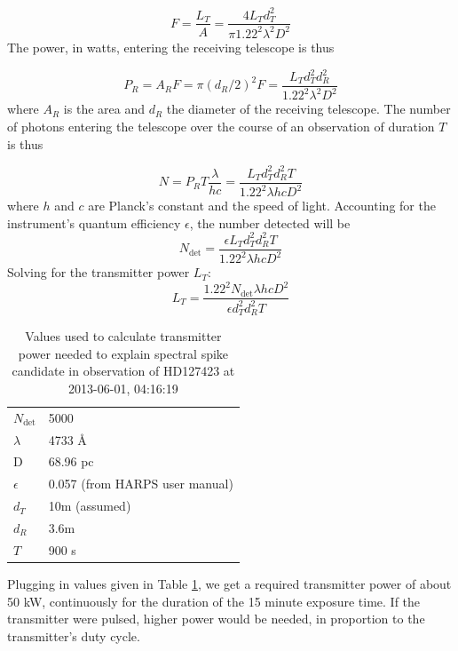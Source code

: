 \documentclass[linenumbers]{aastex631}
\begin{document}
\begin{equation}
    F = \frac{L_T}{A} = \frac{4 L_T d_T^2}{\pi 1.22^2 \lambda^2 D^2}
\end{equation}
The power, in watts, entering the receiving telescope is thus

\begin{equation}
    P_R = A_R F = \pi (d_R/2)^2 F = \frac{L_T d_T^2 d_R^2}{1.22^2 \lambda^2 D^2}
\end{equation}
where $A_R$ is the area and $d_R$ the diameter of the receiving telescope.  The number of photons entering the telescope over the course of an observation of duration $T$ is thus

\begin{equation}
    N = P_R T \frac{\lambda}{h c} = \frac{L_T d_T^2 d_R^2 T}{1.22^2 \lambda h c D^2}
\end{equation}
where $h$ and $c$ are Planck's constant and the speed of light.  Accounting for the instrument's quantum efficiency $\epsilon$, the number detected will be
\begin{equation}
    N_{\mbox{det}} = \frac{\epsilon L_T d_T^2 d_R^2 T}{1.22^2 \lambda h c D^2}
\end{equation}
Solving for the transmitter power $L_T$:
\begin{equation}
    L_T = \frac{1.22^2 N_{\mbox{det}} \lambda h c D^2}{\epsilon d_T^2 d_R^2 T}
\end{equation}

\begin{table}[h]
\begin{tabular}{ll}
$N_{\mbox{det}}$ & 5000\\
$\lambda$ & 4733 \AA \\
D & 68.96 pc \\
$\epsilon$ & 0.057 (from HARPS user manual)\\
$d_T$ & 10m (assumed) \\
$d_R$ & 3.6m \\
$T$ & 900 s\\
\end{tabular}
\label{t:powervalues}
\caption{Values used to calculate transmitter power needed to explain spectral spike candidate in observation of HD127423 at 2013-06-01, 04:16:19}
\end{table}

Plugging in values given in Table \ref{t:powervalues}, we get a required transmitter power of about 50 kW, continuously for the duration of the 15 minute exposure time. If the transmitter were pulsed, higher power would be needed, in proportion to the transmitter's duty cycle. 
\end{document}
